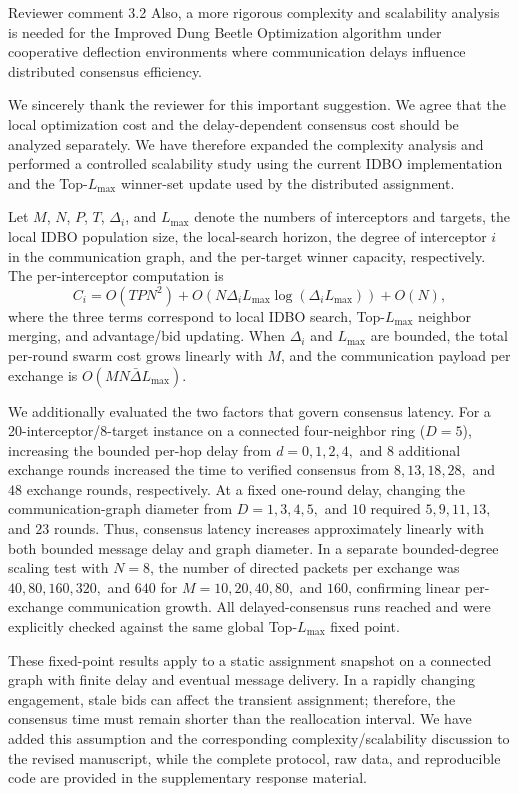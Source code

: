 \begin{reviewercomment}{Reviewer comment 3.2}
Also, a more rigorous complexity and scalability analysis is needed for the
Improved Dung Beetle Optimization algorithm under cooperative deflection
environments where communication delays influence distributed consensus
efficiency.
\end{reviewercomment}

\rsp We sincerely thank the reviewer for this important suggestion. We agree
that the local optimization cost and the delay-dependent consensus cost should
be analyzed separately. We have therefore expanded the complexity analysis and
performed a controlled scalability study using the current IDBO implementation
and the Top-$L_{\max}$ winner-set update used by the distributed assignment.

Let $M$, $N$, $P$, $T$, $\Delta_i$, and $L_{\max}$ denote the numbers of
interceptors and targets, the local IDBO population size, the local-search
horizon, the degree of interceptor $i$ in the communication graph, and the
per-target winner capacity, respectively. The per-interceptor computation is
\[
C_i=O(TPN^2)+O\!\left(N\Delta_iL_{\max}
\log(\Delta_iL_{\max})\right)+O(N),
\]
where the three terms correspond to local IDBO search, Top-$L_{\max}$ neighbor
merging, and advantage/bid updating. When $\Delta_i$ and $L_{\max}$ are bounded,
the total per-round swarm cost grows linearly with $M$, and the communication
payload per exchange is $O(MN\bar{\Delta}L_{\max})$.

We additionally evaluated the two factors that govern consensus latency. For a
20-interceptor/8-target instance on a connected four-neighbor ring
($D=5$), increasing the bounded per-hop delay from
$d=0,1,2,4,$ and $8$ additional exchange rounds increased the time to verified
consensus from $8,13,18,28,$ and $48$ exchange rounds, respectively. At a fixed
one-round delay, changing the communication-graph diameter from
$D=1,3,4,5,$ and $10$ required $5,9,11,13,$ and $23$ rounds. Thus, consensus
latency increases approximately linearly with both bounded message delay and
graph diameter. In a separate bounded-degree scaling test with $N=8$, the
number of directed packets per exchange was $40,80,160,320,$ and $640$ for
$M=10,20,40,80,$ and $160$, confirming linear per-exchange communication growth.
All delayed-consensus runs reached and were explicitly checked against the same
global Top-$L_{\max}$ fixed point.

These fixed-point results apply to a static assignment snapshot on a connected
graph with finite delay and eventual message delivery. In a rapidly changing
engagement, stale bids can affect the transient assignment; therefore, the
consensus time must remain shorter than the reallocation interval. We have added
this assumption and the corresponding complexity/scalability discussion to the
revised manuscript, while the complete protocol, raw data, and reproducible code
are provided in the supplementary response material.

